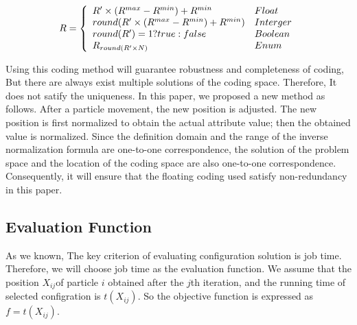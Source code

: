 \begin{equation}
R = \left\{ 
\begin{array}{l l l l}
R' \times {(R^{max}-R^{min})} +R^{min} & Float\\
round(R' \times (R^{max}-R^{min}) + R^{min})  & Interger\\
round(R')= 1?true : false & Boolean\\
{R_{round(R' \times N)}} & Enum
\end{array} \right.
\end{equation}
\par Using this coding method will guarantee robustness and completeness of coding, But there are always exist multiple solutions of the coding space. Therefore, It does not satify the uniqueness. In this paper, we proposed a new method as follows. After a particle movement, the new position is adjusted. The new position is first normalized to obtain the actual attribute value; then the obtained value is normalized. Since the definition domain and the range of the inverse normalization formula are one-to-one correspondence, the solution of the problem space and the location of the coding space are also one-to-one correspondence. Consequently, it will ensure that the floating coding used satisfy  non-redundancy in this paper.
\subsection{Evaluation Function}\label{subsec:evaluation}
\par As we known, The key criterion of evaluating configuration solution is job time. Therefore, we will choose job time as the evaluation function. We assume that the position $X_{ij}$of particle $ \mathit{i} $ obtained after the $j$th iteration, and  the running time of selected configration is $t(X_{ij})$. So the objective function is expressed as $f=t(X_{ij})$.
